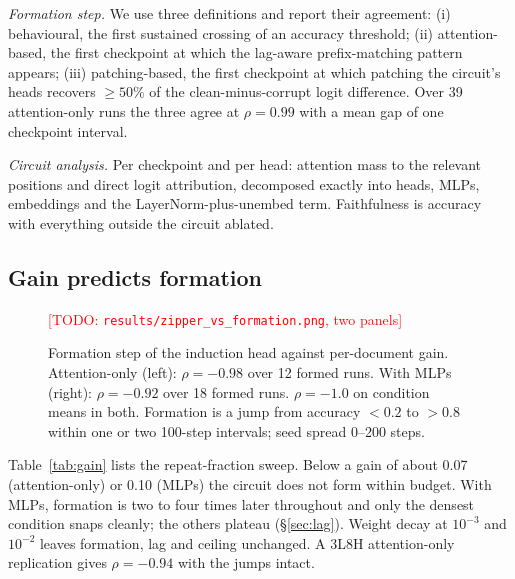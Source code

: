 \documentclass[11pt]{article}
\newcommand{\todo}[1]{\textcolor{red}{[TODO: #1]}}
\begin{document}
\emph{Formation step.} We use three definitions and report their
agreement: (i) behavioural, the first sustained crossing of an accuracy
threshold; (ii) attention-based, the first checkpoint at which the
lag-aware prefix-matching pattern appears; (iii) patching-based, the first
checkpoint at which patching the circuit's heads recovers $\geq50\%$ of the
clean-minus-corrupt logit difference. Over 39 attention-only runs the
three agree at $\rho=0.99$ with a mean gap of one checkpoint interval.

\emph{Circuit analysis.} Per checkpoint and per head: attention mass to
the relevant positions and direct logit attribution, decomposed exactly
into heads, MLPs, embeddings and the LayerNorm-plus-unembed term.
Faithfulness is accuracy with everything outside the circuit ablated.

\subsection{Gain predicts formation}\label{sec:gain}

\begin{figure}[t]\centering
\todo{\texttt{results/zipper\_vs\_formation.png}, two panels}
\caption{Formation step of the induction head against per-document gain.
Attention-only (left): $\rho=-0.98$ over 12 formed runs. With MLPs (right):
$\rho=-0.92$ over 18 formed runs. $\rho=-1.0$ on condition means in both.
Formation is a jump from accuracy $<0.2$ to $>0.8$ within one or two
100-step intervals; seed spread 0--200 steps.}
\label{fig:gain}
\end{figure}

Table~\ref{tab:gain} lists the repeat-fraction sweep. Below a gain of about
0.07 (attention-only) or 0.10 (MLPs) the circuit does not form within
budget. With MLPs, formation is two to four times later throughout and only
the densest condition snaps cleanly; the others plateau
(\S\ref{sec:lag}). Weight decay at $10^{-3}$ and $10^{-2}$ leaves
formation, lag and ceiling unchanged. A 3L8H attention-only replication
gives $\rho=-0.94$ with the jumps intact.
\end{document}
